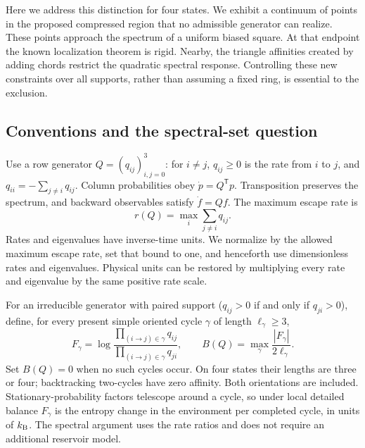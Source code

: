 \documentclass[11pt,a4paper]{article}
\newcommand{\trans}{^{\mathsf T}}
\begin{document}
Here we address this distinction for four states. We exhibit a continuum
of points in the proposed compressed region that no admissible generator
can realize. These points approach the spectrum of a uniform biased square.
At that endpoint the known localization theorem is rigid. Nearby,
the triangle affinities created by adding chords restrict the quadratic
spectral response. Controlling these new constraints over all supports,
rather than assuming a fixed ring, is essential to the exclusion.

\subsection{Conventions and the spectral-set question}

Use a row generator $Q=(q_{ij})_{i,j=0}^3$: for $i\ne j$, $q_{ij}\geq0$
is the rate from $i$ to $j$, and $q_{ii}=-\sum_{j\ne i}q_{ij}$.
Column probabilities obey $\dot p=Q\trans p$. Transposition preserves
the spectrum, and backward observables satisfy $\dot f=Qf$.
The maximum escape rate is
\begin{equation}
 r(Q)=\max_i\sum_{j\ne i}q_{ij}.
\end{equation}
Rates and eigenvalues have inverse-time units. We normalize by the allowed
maximum escape rate, set that bound to one, and henceforth use
dimensionless rates and eigenvalues. Physical units can be restored by
multiplying every rate and eigenvalue by the same positive rate scale.

For an irreducible generator with paired support
($q_{ij}>0$ if and only if $q_{ji}>0$), define, for every present simple
oriented cycle $\gamma$ of length $\ell_\gamma\geq3$,
\begin{equation}\label{eq:affinity}
 F_\gamma=\log\frac{\prod_{(i\to j)\in\gamma}q_{ij}}
                          {\prod_{(i\to j)\in\gamma}q_{ji}},
 \qquad B(Q)=\max_\gamma\frac{|F_\gamma|}{2\ell_\gamma}.
\end{equation}
Set $B(Q)=0$ when no such cycles occur. On four states their lengths
are three or four; backtracking two-cycles have zero affinity.
Both orientations are included. Stationary-probability factors telescope
around a cycle, so under local detailed balance $F_\gamma$ is the entropy
change in the environment per completed cycle, in units of $k_{\rm B}$.
The spectral argument uses the rate ratios and does not require an
additional reservoir model.
\end{document}
